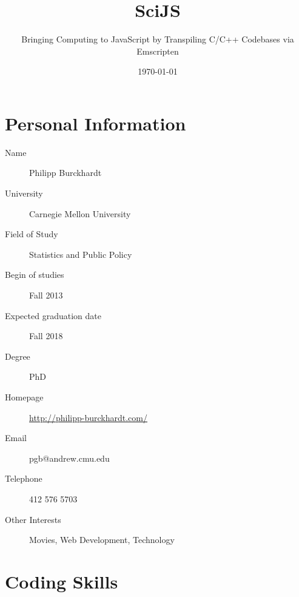 \documentclass{scrartcl}
\title{SciJS}
\subtitle{Bringing Computing to JavaScript by Transpiling C/C++ Codebases via Emscripten}
\date{\today}
\author{}
\begin{document}
\maketitle

\section{Personal Information}

\begin{description}
   \item [Name] Philipp Burckhardt
   \item [University] Carnegie Mellon University
   \item [Field of Study] Statistics and Public Policy
   \item [Begin of studies] Fall 2013
   \item [Expected graduation date] Fall 2018
   \item [Degree] PhD
   \item [Homepage] \url{http://philipp-burckhardt.com/}
   \item [Email] pgb@andrew.cmu.edu
   \item [Telephone] 412 576 5703
   \item [Other Interests] Movies, Web Development, Technology
\end{description}

\section{Coding Skills}
\end{document}
